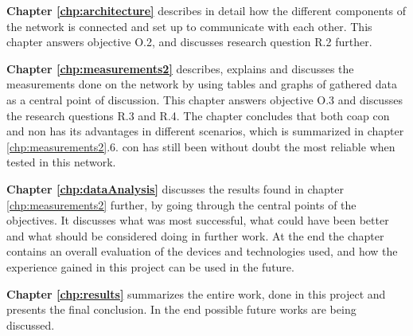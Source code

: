 \noindent \textbf{Chapter \ref{chp:architecture}} describes in detail how the different components of the network is connected and set up to communicate with each other. This chapter answers objective O.2, and discusses research question R.2 further. 

\noindent \textbf{Chapter \ref{chp:measurements2}} describes, explains and discusses the measurements done on the network by using tables and graphs of gathered data as a central point of discussion. This chapter answers objective O.3 and discusses the research questions R.3 and R.4. The chapter concludes that both \gls{coap} \gls{con} and \gls{non} has its advantages in different scenarios, which is summarized in chapter \ref{chp:measurements2}.6. \gls{con} has still been without doubt the most reliable when tested in this network. 

\noindent \textbf{Chapter \ref{chp:dataAnalysis}} discusses the results found in chapter \ref{chp:measurements2} further, by going through the central points of the objectives. It discusses what was most successful, what could have been better and what should be considered doing in further work. At the end the chapter contains an overall evaluation of the devices and technologies used, and how the experience gained in this project can be used in the future. 

\noindent \textbf{Chapter \ref{chp:results}} summarizes the entire work, done in this project and presents the final conclusion. In the end possible future works are being discussed. 





